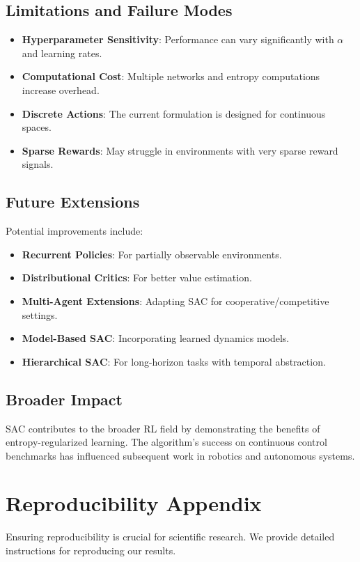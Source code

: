 \documentclass[conference]{IEEEtran}
\begin{document}
\subsection{Limitations and Failure Modes}
\begin{itemize}
  \item \textbf{Hyperparameter Sensitivity}: Performance can vary significantly with $\alpha$ and learning rates.
  \item \textbf{Computational Cost}: Multiple networks and entropy computations increase overhead.
  \item \textbf{Discrete Actions}: The current formulation is designed for continuous spaces.
  \item \textbf{Sparse Rewards}: May struggle in environments with very sparse reward signals.
\end{itemize}

\subsection{Future Extensions}
Potential improvements include:
\begin{itemize}
  \item \textbf{Recurrent Policies}: For partially observable environments.
  \item \textbf{Distributional Critics}: For better value estimation.
  \item \textbf{Multi-Agent Extensions}: Adapting SAC for cooperative/competitive settings.
  \item \textbf{Model-Based SAC}: Incorporating learned dynamics models.
  \item \textbf{Hierarchical SAC}: For long-horizon tasks with temporal abstraction.
\end{itemize}

\subsection{Broader Impact}
SAC contributes to the broader RL field by demonstrating the benefits of entropy-regularized learning. The algorithm's success on continuous control benchmarks has influenced subsequent work in robotics and autonomous systems.

\section{Reproducibility Appendix}
Ensuring reproducibility is crucial for scientific research. We provide detailed instructions for reproducing our results.
\end{document}
